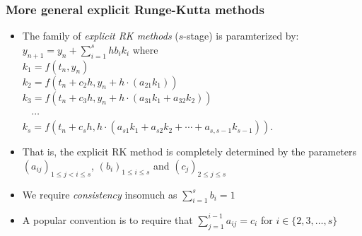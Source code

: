 \documentclass[usenames,svgnames,dvipsnames,10pt]{beamer}
\begin{document}
\begin{frame}
\frametitle{More general explicit Runge-Kutta methods}

\begin{itemize} 

\item The family of \emph{explicit RK methods} ($s$-stage) is paramterized by: \\ 
      $y_{n+1} = y_n + \sum\limits_{i=1}^{s} hb_ik_i$ where \\ 
      $k_1 = f(t_n, y_n)$ \\ 
      $k_2 = f(t_n + c_2h, y_n +h \cdot (a_{21}k_1))$ \\ 
      $k_3 = f(t_n + c_3h, y_n + h \cdot (a_{31}k_1 + a_{32}k_2))$ \\ 
      $\phantom{k_4}\cdots$ \\ 
      $k_s = f(t_n + c_sh, h \cdot(a_{s1}k_1 + a_{s2}k_2 + \cdots + a_{s,s-1}k_{s-1}))$. 
\item That is, the explicit RK method is completely determined by the parameters 
      $(a_{ij})_{1 \leq j < i \leq s}$, $(b_i)_{1 \leq i \leq s}$ and $(c_j)_{2 \leq j \leq s}$
\item We require \emph{consistency} insomuch as $\sum\limits_{i=1}^s b_i = 1$ 
\item A popular convention is to require that $\sum\limits_{j=1}^{i-1} a_{ij} = c_i$ for $i \in \{2,3,\ldots,s\}$ 

\end{itemize} 

\end{frame}
\end{document}
